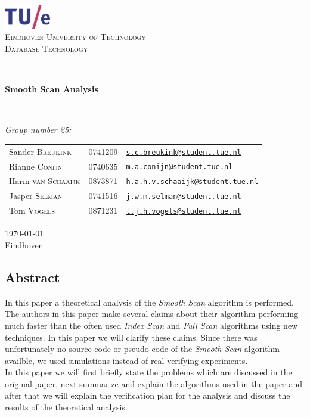 \documentclass[a4paper,11pt,twoside]{article}
\author{
	Sander Breukink (0741209) - \texttt{s.c.breukink@student.tue.nl}\\
	Rianne Conijn (0740635) - \texttt{m.a.conijn@student.tue.nl}\\
	Harm van Schaaijk (0873871) - \texttt{h.a.h.v.schaaijk@student.tue.nl}\\
	Jasper Selman (0741516) - \texttt{j.w.m.selman@student.tue.nl}\\
	Tom Vogels (0871231) - \texttt{t.j.h.vogels@student.tue.nl}
}
\date{\today}
\newcommand{\HRule}{\rule{\linewidth}{0.5mm}}
\newcommand{\uni}{Eindhoven University of Technology}
\newcommand{\vak}{Database Technology}
\newcommand{\essaytitle}{Smooth Scan Analysis}
\newcommand{\stad}{Eindhoven}
\begin{document}
	\begin{center} \thispagestyle{empty}

		\includegraphics[width=0.15\textwidth]{images/tuelogo}\\[1cm]

		\textsc{\LARGE \uni}\\[1.6cm]


        \textsc{\LARGE \vak}\\[0.5cm]

\HRule \\[0.4cm]
{ \huge \bfseries \essaytitle}\\[0.4cm]

\HRule \\[1.5cm]

	\emph{Group number 25:}\\
    \begin{tabular}{l l l}
	Sander \textsc{Breukink} & 0741209 & \href{mailto:s.c.breukink@student.tue.nl}{\texttt{s.c.breukink@student.tue.nl}}\\
	Rianne \textsc{Conijn} & 0740635 & \href{mailto:m.a.conijn@student.tue.nl}{\texttt{m.a.conijn@student.tue.nl}}\\
	Harm \textsc{van Schaaijk} & 0873871 & \href{mailto:h.a.h.v.schaaijk@student.tue.nl}{\texttt{h.a.h.v.schaaijk@student.tue.nl}}\\
	Jasper \textsc{Selman} & 0741516 & \href{mailto:j.w.m.selman@student.tue.nl}{\texttt{j.w.m.selman@student.tue.nl}}\\
	Tom \textsc{Vogels} & 0871231 & \href{mailto:t.j.h.vogels@student.tue.nl}{\texttt{t.j.h.vogels@student.tue.nl}}
    \end{tabular}
		\vfill

{\large \today} \\
\stad

	\end{center}

    \newpage
\begin{center}\section*{Abstract}\end{center}
In this paper a theoretical analysis of the \textit{Smooth Scan} algorithm \cite{smoothscan} is performed. The authors in this paper make several claims about their algorithm performing much faster than the often used \textit{Index Scan} and \textit{Full Scan} algorithms using new techniques. In this paper we will clarify these claims. Since there was unfortunately no source code or pseudo code of the \textit{Smooth Scan} algorithm availble, we used simulations instead of real verifying experiments. \\
In this paper we will first briefly state the problems which are discussed in the original paper, next summarize and explain the algorithms used in the paper and after that we will explain the verification plan for the analysis and discuss the results of the theoretical analysis.
\end{document}
